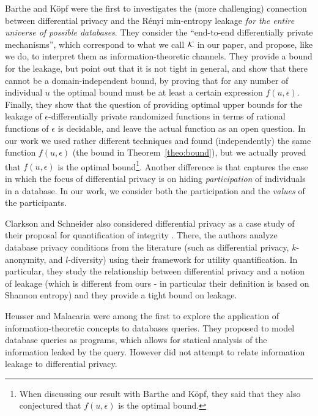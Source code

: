 \documentclass{llncs}
\begin{document}
Barthe and K\"opf \cite{Barthe:11:CSF} were the first to investigates the (more
challenging) connection between differential privacy and the R\'enyi
min-entropy leakage \emph{for the entire universe of possible databases}.
They consider the ``end-to-end differentially private mechanisms'',
which correspond to what we call $\cal K$ in
our paper, and propose, like we do, to interpret them as information-theoretic
channels. 
They provide a bound for the leakage, but  point out that it  is not tight in general, and show that there cannot be a
domain-independent bound, by proving that for any number of individual
$u$ the optimal bound must be at least a certain expression $f(u,\epsilon)$.
Finally, they show that the question of providing optimal upper bounds
for the leakage of $\epsilon$-differentially private randomized functions in
terms of rational functions of $\epsilon$ is decidable, and leave the actual
function as an open question. In our work we used rather different
techniques and found (independently) the same function $f(u,\epsilon)$ 
(the bound in Theorem~\ref{theo:bound}), but 
 we actually proved  that $f(u,\epsilon)$ is the
optimal bound\footnote{When discussing our result with Barthe and
K\"opf, they said that they also conjectured that $f(u,\epsilon)$ is the
optimal bound.}.
Another difference is that \cite{Barthe:11:CSF}  captures the case in which the focus
of differential privacy is on hiding \emph{participation} of
individuals in a database. In our work, we consider both the participation and    the \emph{values} of the participants.

Clarkson and Schneider also considered differential privacy as a case study of their proposal for quantification of integrity  \cite{Clarkson:11:TECHREP}. There, the authors analyze database privacy conditions from the literature (such as differential privacy, $k$-anonymity, and $l$-diversity) using their framework for utility quantification. In particular, they study the relationship between differential privacy and a notion of leakage (which is different from ours - in particular their definition is based on Shannon entropy) and they provide a tight bound on leakage. 

Heusser and Malacaria \cite{Heusser:09:FAST} were among the first to explore the application of information-theoretic concepts to databases queries. They proposed to model database queries as programs, which allows for statical analysis of the information leaked by the query.  However  \cite{Heusser:09:FAST}  did not attempt to relate information leakage to differential privacy.
\end{document}
